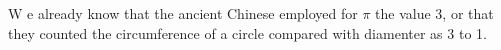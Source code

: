 \documentclass{book}
\begin{document}
\lettrine[lines=3,lhang=0.2,loversize=0.2]
{W}{} e already know that the ancient
Chinese employed for $\pi$ the value 3,
or that they counted the circumference
of a circle compared with diamenter as
3 to 1.
\end{document}
